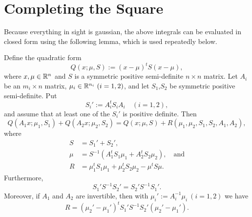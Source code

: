 \documentclass[12pt,leqno]{article}
\begin{document}
\section{Completing the Square} 
Because everything in sight is gaussian, the above integrals can be evaluated in closed form
using the following lemma, which is used repeatedly below.
\begin{Lem}
 Define the quadratic form
  $$
 Q(x;\mu,S) := (x-\mu)^tS(x-\mu),
  $$
  where $x,\mu\in {\mathbb R}^n$ and  $S$ is a symmetric positive semi-definite $n\times{n}$
  matrix. Let $A_i$ be an $m_i\times{n}$ matrix, $\mu_i\in{\mathbb R}^{n_i} ~ (i = 1,2)$,
  and let $S_1$,$S_2$ be symmetric positive semi-definite. Put
  $$
  S_i' := A_i^tS_iA_i\quad (i = 1,2),
  $$
  and assume that at least one of the $S_i'$ is positive definite.  Then 
\begin{equation}\label{comp_sq:1}
  Q(A_1x;\mu_1,S_1)+Q(A_2x;\mu_2,S_2) = Q(x;\mu,S) + R(\mu_1,\mu_2,S_1,S_2,A_1,A_2),
\end{equation}
where 
\begin{align}
S &= S_1' + S_2', \label{sigma}\\
\mu &= S^{-1}(A_1^tS_1\mu_1 + A_2^tS_2\mu_2),\quad\text{and}\label{mu}\\
R &= \mu_1^tS_1\mu_1 + \mu_2^tS_2\mu_2 - \mu^tS\mu. \label{R_def} 
\end{align}
Furthermore, 
\begin{equation}\label{comp_sq:3}
  S_1'S^{-1}S_2' = S_2'S^{-1}S_1'.
\end{equation}
Moreover, if $A_1$ and $A_2$ are invertible, then with $\mu_i' := A_i^{-1}\mu_i ~ (i = 1,2)$ we have
\begin{equation}\label{comp_sq:R}
R = (\mu_2'-\mu_1')^tS_1'S^{-1}S_2'(\mu_2'-\mu_1').
\end{equation}
\end{Lem}
\end{document}
